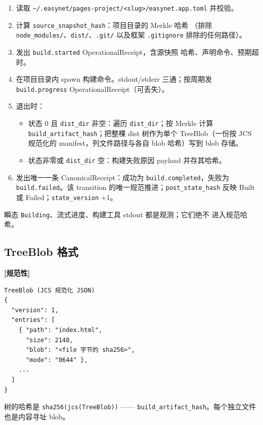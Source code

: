 \documentclass[11pt,a4paper]{article}
\newcommand{\normsv}{\textcolor{normativecolor}{\textbf{[规范性]}}\xspace}
\theoremstyle{definition}
\begin{document}
\begin{enumerate}[leftmargin=2.2em,itemsep=0.18em]
    \item 读取
    \texttt{\textasciitilde/.easynet/pages-project/<slug>/easynet.app.toml}
    并校验。
    \item 计算 \texttt{source\_snapshot\_hash}：项目目录的 Merkle 哈希
    （排除 \texttt{node\_modules/}、\texttt{dist/}、\texttt{.git/}
    以及框架 \texttt{.gitignore} 排除的任何路径）。
    \item 发出 \texttt{build.started} OperationalReceipt，含源快照
    哈希、声明命令、预期超时。
    \item 在项目目录内 spawn 构建命令。stdout/stderr 三通；按周期发
    \texttt{build.progress} OperationalReceipt（可丢失）。
    \item 退出时：
    \begin{itemize}[leftmargin=1.5em]
        \item 状态 0 且 \texttt{dist\_dir} 非空：遍历
        \texttt{dist\_dir}；按 Merkle 计算
        \texttt{build\_artifact\_hash}；把整棵 dist 树作为单个
        TreeBlob（一份按 JCS 规范化的 manifest，列文件路径与各自
        blob 哈希）写到 blob 存储。
        \item 状态非零或 \texttt{dist\_dir} 空：构建失败原因 payload
        并存其哈希。
    \end{itemize}
    \item 发出唯一一条 CanonicalReceipt：成功为
    \texttt{build.completed}，失败为 \texttt{build.failed}。该
    transition 的唯一规范推进；\texttt{post\_state\_hash} 反映 Built
    或 Failed；\texttt{state\_version} +1。
\end{enumerate}

瞬态 \texttt{Building}、流式进度、构建工具 stdout 都是观测；它们绝不
进入规范哈希。

\subsection{TreeBlob 格式}

\normsv{}

\begin{lstlisting}
TreeBlob (JCS 规范化 JSON)
{
  "version": 1,
  "entries": [
    { "path": "index.html",
      "size": 2148,
      "blob": "<file 字节的 sha256>",
      "mode": "0644" },
    ...
  ]
}
\end{lstlisting}

树的哈希是 \texttt{sha256(jcs(TreeBlob))} ——
\texttt{build\_artifact\_hash}。每个独立文件也是内容寻址 blob。
\end{document}
